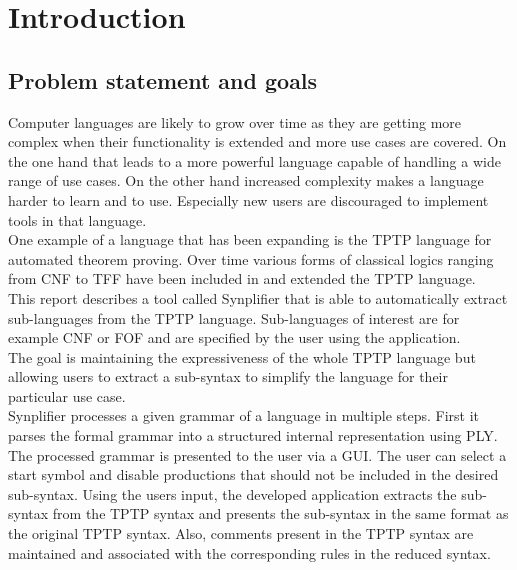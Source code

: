 
\chapter{Introduction}\label{cha:Introduction}

\section{Problem statement and goals}\label{sec:Aufgabenstellung}
Computer languages are likely to grow over time as they are getting more complex when their functionality is extended and more use cases are covered.
On the one hand that leads to a more powerful language capable of handling a wide range of use cases.
On the other hand increased complexity makes a language harder to learn and to use. Especially new users are discouraged to implement tools in that language.\\
One example of a language that has been expanding is the \ac{TPTP} language for automated theorem proving. Over time
various forms of classical logics ranging from \ac{CNF} to \ac{TFF} have been included in and extended the \ac{TPTP} language. \\
This report describes a tool called \ac{Synplifier} that is able to automatically extract sub-languages from the \ac{TPTP} language. Sub-languages of interest are for example \ac{CNF} or \ac{FOF} and are specified by the user using the application.\\
The goal is maintaining the expressiveness of the whole \ac{TPTP} language but allowing users to extract a sub-syntax to simplify the language for their particular use case. \\
\ac{Synplifier} processes a given grammar of a language in multiple steps.
First it parses the formal grammar into a structured internal representation using \ac{PLY}.
The processed grammar is presented to the user via a GUI. The user can select a start symbol and disable productions that should not be included in the desired sub-syntax.
Using the users input, the developed application extracts the sub-syntax from the \ac{TPTP} syntax and presents the sub-syntax in the same format as the original \ac{TPTP} syntax.
Also, comments present in the \ac{TPTP} syntax are maintained and associated with the corresponding rules in the reduced syntax.

